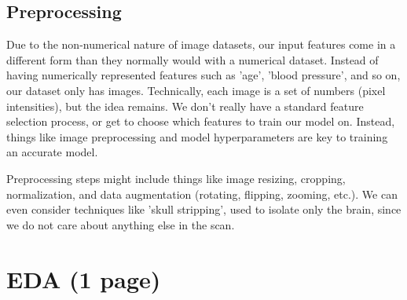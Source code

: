\documentclass[conference]{IEEEtran}
\begin{document}
\subsection{\large Preprocessing}

Due to the non-numerical nature of image datasets, our input features come in a different form than they normally would with a numerical dataset. Instead of having numerically represented features such as 'age', 'blood pressure', and so on, our dataset only has images. Technically, each image is a set of numbers (pixel intensities), but the idea remains. We don't really have a standard feature selection process, or get to choose which features to train our model on. Instead, things like image preprocessing and model hyperparameters are key to training an accurate model.

Preprocessing steps might include things like image resizing, cropping, normalization, and data augmentation (rotating, flipping, zooming, etc.). We can even consider techniques like 'skull stripping', used to isolate only the brain, since we do not care about anything else in the scan.

\section{\large EDA (1 page)}




\end{document}
